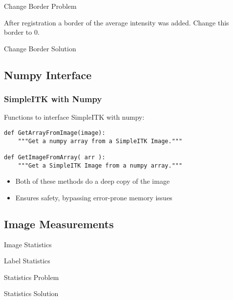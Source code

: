 \begin{frame}{Change Border Problem}

After registration a border of the average intensity was added. Change this border to 0.

\end{frame}

\begin{frame}{Change Border Solution}
\end{frame}

\subsection{Numpy Interface}
\begin{frame}[fragile]
\frametitle{SimpleITK with Numpy}

Functions to interface SimpleITK with numpy:

\lstpython
\begin{lstlisting}
def GetArrayFromImage(image):
    """Get a numpy array from a SimpleITK Image."""

def GetImageFromArray( arr ):
    """Get a SimpleITK Image from a numpy array."""
\end{lstlisting}
\begin{itemize}
  \item Both of these methods do a deep copy of the image
  \item Ensures safety, bypassing error-prone memory issues
\end{itemize}

\end{frame}

%
%

\subsection{Image Measurements}
\begin{frame}{Image Statistics}
\end{frame}

\begin{frame}{Label Statistics}
\end{frame}


\begin{frame}{Statistics Problem}
\end{frame}

\begin{frame}{Statistics Solution}
\end{frame}



